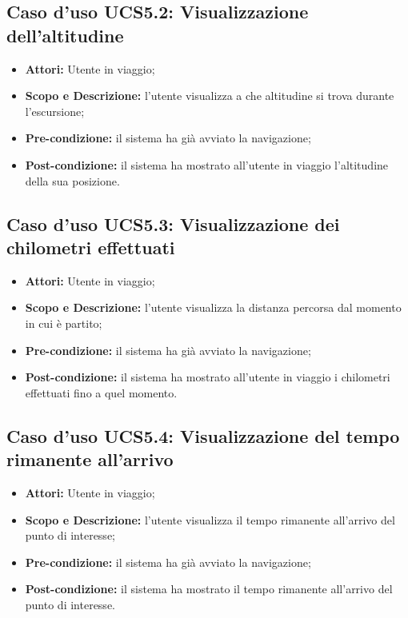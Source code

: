 \subsection{Caso d'uso UCS5.2: Visualizzazione dell'altitudine}
\begin{itemize}
\item \textbf{Attori:} Utente in viaggio;
\item \textbf{Scopo e Descrizione:} l'utente visualizza a che altitudine si trova durante l'escursione;
\item \textbf{Pre-condizione:} il sistema ha già avviato la navigazione;
\item \textbf{Post-condizione:} il sistema ha mostrato all'utente in viaggio l'altitudine della sua posizione.
\end{itemize}

\subsection{Caso d'uso UCS5.3: Visualizzazione dei chilometri effettuati}
\begin{itemize}
\item \textbf{Attori:} Utente in viaggio;
\item \textbf{Scopo e Descrizione:} l'utente visualizza la distanza percorsa dal momento in cui è partito;
\item \textbf{Pre-condizione:} il sistema ha già avviato la navigazione;
\item \textbf{Post-condizione:} il sistema ha mostrato all'utente in viaggio i chilometri effettuati fino a quel momento.
\end{itemize}

\subsection{Caso d'uso UCS5.4: Visualizzazione del tempo rimanente all'arrivo}
\begin{itemize}
\item \textbf{Attori:} Utente in viaggio;
\item \textbf{Scopo e Descrizione:} l'utente visualizza il tempo rimanente all'arrivo del punto di interesse;
\item \textbf{Pre-condizione:} il sistema ha già avviato la navigazione;
\item \textbf{Post-condizione:} il sistema ha mostrato il tempo rimanente all'arrivo del punto di interesse.
\end{itemize}

